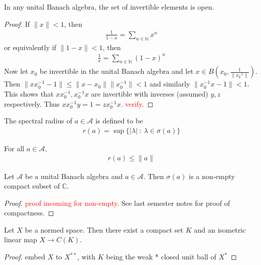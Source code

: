 \begin{lemma}
  In any unital Banach algebra, the set of invertible elements is open.
\end{lemma}
\begin{proof}
  If $\|x\| < 1$, then
  \begin{align*}
    \frac{1}{1 - x} = \sum_{n \in \mathbb{N}} x^n
  \end{align*}
  or equivalently if $\|1 - x\| < 1$, then
  \begin{align*}
    \frac{1}{x} = \sum_{n \in \mathbb{N}} (1-x)^n
  \end{align*}
  Now let $x_0$ be invertible in the unital Banach algebra and let $x
  \in B(x_0, \frac{1}{\|x_0^{-1}\|})$. Then $\|xx_0^{-1}  - 1\| \le
  \|x - x_0\| \|x_0^{-1}\| < 1$ and similarly $\|x_0^{-1}x - 1\| <
  1$. This shows that $xx_0^{-1}, x_0^{-1}x$ are invertible with
  inverses (assumed) $y, z$ respectively. Thus $xx_0^{-1}y = 1 =
  zx_0^{-1}x$. \textcolor{red}{verify}.
\end{proof}

\begin{definition}
  The spectral radius of $a \in \mathcal{A}$ is defined to be
  \begin{align*}
    r(a) = \sup \{ |\lambda|  \ : \   \lambda \in \sigma(a) \}
  \end{align*}
\end{definition}

\begin{lemma} For all $a \in \mathcal{A}$,
  \begin{align*}
    r(a) \le \|a\|
  \end{align*}
\end{lemma}

\begin{theorem}
  Let $\mathcal{A}$ be a unital Banach algebra and $a \in
  \mathcal{A}$. Then $\sigma(a)$ is a non-empty compact subset of $\mathbb{C}$.
\end{theorem}
\begin{proof}
  \textcolor{red}{proof incoming for non-empty.} See last semester
  notes for proof of compactness.
\end{proof}

\begin{lemma}
  Let $X$ be a normed space. Then there exist a compact set $K$ and
  an isometric linear map $X \to C(K)$.
\end{lemma}
\begin{proof}
  embed $X$ to $X^{**}$, with $K$ being the weak * closed unit ball of $X^*$
\end{proof}


